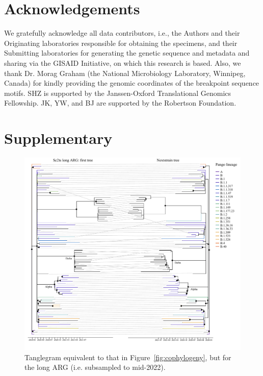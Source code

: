 \documentclass{article}
\begin{document}
\section{Acknowledgements}

We gratefully acknowledge all data contributors, i.e., the Authors and their
Originating laboratories responsible for obtaining the specimens, and their
Submitting laboratories for generating the genetic sequence and metadata and
sharing via the GISAID Initiative, on which this research is based. Also, we
thank Dr. Morag Graham (the National Microbiology Laboratory, Winnipeg, Canada)
for kindly providing the genomic coordinates of the breakpoint sequence motifs.
SHZ is supported by the Janssen-Oxford Translational Genomics Fellowship. JK,
YW, and BJ are supported by the Robertson Foundation.





\renewcommand\thefigure{S\arabic{figure}}
\setcounter{figure}{0}
\renewcommand\thetable{S\arabic{table}}
\setcounter{table}{0}
\section*{Supplementary}

\begin{figure} \centering
\includegraphics[width=\textwidth]{figures/supp_cophylogeny_long.pdf}
\caption{\label{fig:cophylogeny_long}Tanglegram equivalent to that in
Figure~\ref{fig:cophylogeny}, but for the long ARG (i.e. subsampled to mid-2022). }
\end{figure}
\end{document}
